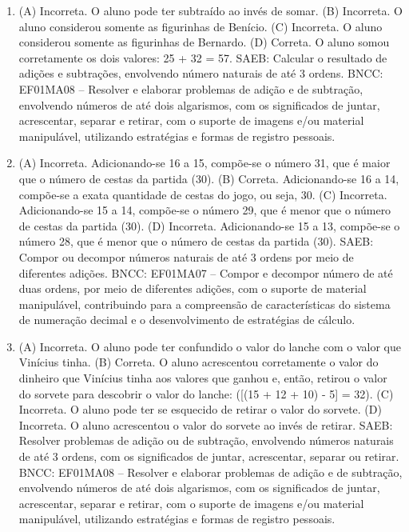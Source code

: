 
\begin{enumerate}
\item
(A)  Incorreta. O aluno pode ter subtraído ao invés de somar.
(B)  Incorreta. O aluno considerou somente as figurinhas de Benício.
(C)  Incorreta. O aluno considerou somente as figurinhas de Bernardo.
(D)  Correta. O aluno somou corretamente os dois valores: 25 + 32 = 57.
SAEB: Calcular o resultado de adições e subtrações, envolvendo
número naturais de até 3 ordens.
BNCC: EF01MA08 -- Resolver e elaborar problemas de adição e de subtração,
envolvendo números de até dois algarismos, com os significados de juntar, acrescentar, separar e retirar, com o suporte de imagens e/ou material manipulável, utilizando estratégias e formas de registro pessoais.

\item
(A) Incorreta. Adicionando-se 16 a 15, compõe-se o número 31, que é maior que o número de cestas da partida (30).
(B) Correta. Adicionando-se 16 a 14, compõe-se a exata quantidade de cestas do jogo, ou seja, 30.
(C) Incorreta. Adicionando-se 15 a 14, compõe-se o número 29, que é menor que o número de cestas da partida (30).
(D) Incorreta. Adicionando-se 15 a 13, compõe-se o número 28, que é menor que o número de cestas da partida (30).
SAEB: Compor ou decompor números naturais de até 3 ordens por
meio de diferentes adições.
BNCC: EF01MA07 -- Compor e decompor número de até duas ordens, por meio
de diferentes adições, com o suporte de material manipulável,
contribuindo para a compreensão de características do sistema de
numeração decimal e o desenvolvimento de estratégias de cálculo.

\item
(A)  Incorreta. O aluno pode ter confundido o valor do lanche com o valor
  que Vinícius tinha.
(B)  Correta. O aluno acrescentou corretamente o valor do dinheiro que Vinícius tinha
  aos valores que ganhou e, então, retirou o valor do sorvete para
  descobrir o valor do lanche: ([(15 + 12 + 10) - 5] = 32).
(C)  Incorreta. O aluno pode ter se esquecido de retirar o valor do sorvete.
(D)  Incorreta. O aluno acrescentou o valor do sorvete ao invés de retirar.
SAEB: Resolver problemas de adição ou de subtração, envolvendo
números naturais de até 3 ordens, com os significados de juntar,
acrescentar, separar ou retirar.
BNCC: EF01MA08 -- Resolver e elaborar problemas de adição e de subtração,
envolvendo números de até dois algarismos, com os significados de
juntar, acrescentar, separar e retirar, com o suporte de imagens e/ou
material manipulável, utilizando estratégias e formas de registro
pessoais.
\end{enumerate}

